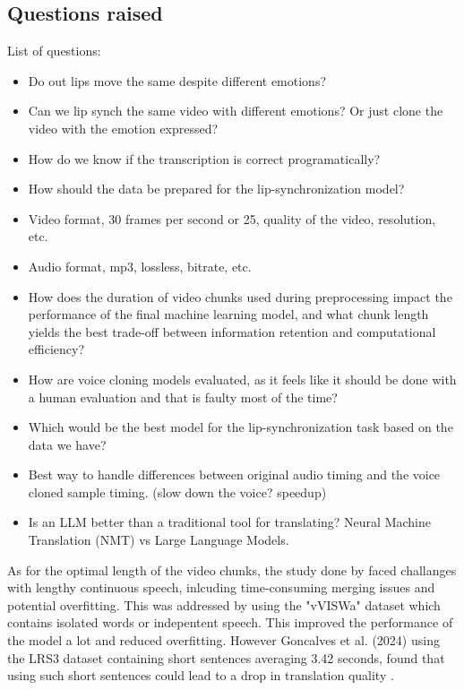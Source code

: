 \documentclass[12pt]{article}
\begin{document}
\subsection{Questions raised}
List of questions:
\begin{itemize}
    \item Do out lips move the same despite different emotions?
    \item Can we lip synch the same video with different emotions? Or just clone the video with the emotion expressed?
    \item How do we know if the transcription is correct programatically?
    \item How should the data be prepared for the lip-synchronization model?
    \item Video format, 30 frames per second or 25, quality of the video, resolution, etc.
    \item Audio format, mp3, lossless, bitrate, etc.
    \item How does the duration of video chunks used during preprocessing impact the performance of the final machine learning model, and what chunk length yields the best trade-off between information retention and computational efficiency?
    \item How are voice cloning models evaluated, as it feels like it should be done with a human evaluation and that is faulty most of the time?
    \item Which would be the best model for the lip-synchronization task based on the data we have?
    \item Best way to handle differences between original audio timing and the voice cloned sample timing. (slow down the voice? speedup)
    \item Is an LLM better than a traditional tool for translating? Neural Machine Translation (NMT) vs Large Language Models.
\end{itemize}
As for the optimal length of the video chunks, the study done by \cite{PAWAR2024100084} faced challanges with lengthy continuous speech, inlcuding time-consuming merging issues and potential overfitting. This was addressed by using the "vVISWa" dataset which contains isolated words or indepentent speech. This improved the performance of the model a lot and reduced overfitting. However Goncalves et al. (2024) using the LRS3 dataset containing short sentences averaging 3.42 seconds, found that using such short sentences could lead to a drop in translation quality \cite{lipsynchronydirectaudiovisual}.
\end{document}
